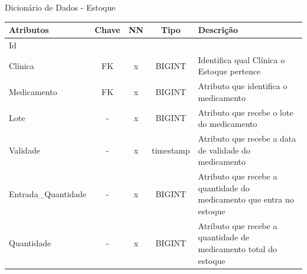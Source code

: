 \documentclass[
    12pt,               %
    openright,          %
    oneside,
    a4paper,            %
    BIBLATEX,           %
    TODO,               %
    english,            %
    brazil              %
    ]{ifsp-spo-inf-ctds}
\begin{document}
    \begin{center}
      \begin{quadro}[H]
      \centering
          \caption{Dicionário de Dados - Estoque}
          \begin{tabulary}{1.0\textwidth}{|p{9em}|c|c|c|p{19em}|}
        \hline
        Atributos & Chave & NN & Tipo & Descrição\\
        \hline
        Id & & & & \\
        \hline
        Clínica & FK & x & BIGINT & Identifica qual Clínica o Estoque pertence\\
        \hline
        Medicamento & FK & x & BIGINT & Atributo que identifica o medicamento\\
        \hline
        Lote & - & x & BIGINT & Atributo que recebe o lote do medicamento\\
        \hline
        Validade & - & x & timestamp & Atributo que recebe a data de validade do medicamento \\
        \hline
        Entrada\_Quantidade & - & x & BIGINT & Atributo que recebe a quantidade do medicamento que entra no estoque\\
        \hline
        Quantidade & - & x & BIGINT & Atributo que recebe a quantidade de medicamento total do estoque \\
        \hline
        \end{tabulary}
         
          \label{qd: md-estoque}
      \end{quadro}
    \end{center}
    
\end{document}
